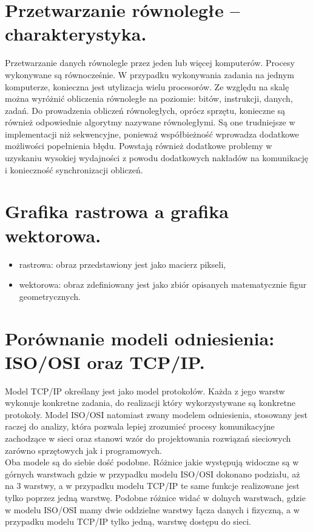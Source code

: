\documentclass[12pt,a4paper]{article}
\begin{document}
	\section{Przetwarzanie równoległe – charakterystyka.}
	Przetwarzanie danych równolegle przez jeden lub więcej komputerów. Procesy wykonywane są równocześnie. W przypadku wykonywania zadania na jednym komputerze, konieczna jest utylizacja wielu procesorów. Ze względu na skalę można wyróżnić obliczenia równoległe na poziomie: bitów, instrukcji, danych, zadań. Do prowadzenia obliczeń równoległych, oprócz sprzętu, konieczne są również odpowiednie algorytmy nazywane równoległymi. Są one trudniejsze w implementacji niż sekwencyjne, ponieważ współbieżność wprowadza dodatkowe możliwości popełnienia błędu. Powstają również dodatkowe problemy w uzyskaniu wysokiej wydajności z powodu dodatkowych nakładów na komunikację i konieczność synchronizacji obliczeń.

	\section{Grafika rastrowa a grafika wektorowa.}
	\begin{itemize}
		\item rastrowa: obraz przedstawiony jest jako macierz pikseli,
		\item wektorowa: obraz zdefiniowany jest jako zbiór opisanych matematycznie figur geometrycznych.
	\end{itemize}

	\section{Porównanie modeli odniesienia: ISO/OSI oraz TCP/IP.}
	Model TCP/IP określany jest jako model protokołów. Każda z jego warstw wykonuje konkretne zadania, do realizacji który wykorzystywane są konkretne protokoły. Model ISO/OSI natomiast zwany modelem odniesienia, stosowany jest raczej do analizy, która pozwala lepiej zrozumieć procesy komunikacyjne zachodzące w sieci oraz stanowi wzór do projektowania rozwiązań sieciowych zarówno sprzętowych jak i programowych.\\
	Oba modele są do siebie dość podobne. Różnice jakie występują widoczne są w górnych warstwach gdzie w przypadku modelu ISO/OSI dokonano podziału, aż na 3 warstwy, a w przypadku modelu TCP/IP te same funkcje realizowane jest tylko poprzez jedną warstwę. Podobne różnice widać w dolnych warstwach, gdzie w modelu ISO/OSI mamy dwie oddzielne warstwy łącza danych i fizyczną, a w przypadku modelu TCP/IP tylko jedną, warstwę dostępu do sieci.
	
\end{document}
